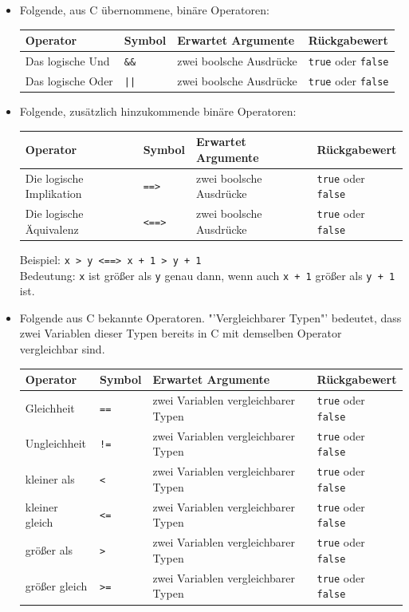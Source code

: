 \documentclass[a4paper]{scrreprt}
\begin{document}
\begin{itemize}
\item Folgende, aus C übernommene, binäre Operatoren:
\begin{table}[H]
\begin{tabular}{|p{3cm}|p{}|p{}|p{3cm}|}
	Operator & Symbol & Erwartet Argumente & Rückgabewert \\
	\hline
	Das logische Und & \verb!&&! & zwei boolsche Ausdrücke & \texttt{true} oder \texttt{false} \\
	Das logische Oder & \verb!||! & zwei boolsche Ausdrücke & \texttt{true} oder \texttt{false}	
	\end{tabular}
\end{table}	

\item Folgende, zusätzlich hinzukommende binäre Operatoren:
\begin{table}[H]
\begin{tabular}{|p{4cm}|p{}|p{}|p{3cm}|}
	Operator & Symbol & Erwartet Argumente & Rückgabewert \\
	\hline
	Die logische Implikation & \verb!==>! & zwei boolsche Ausdrücke & \texttt{true} oder \texttt{false} \\
	Die logische Äquivalenz & \verb!<==>! & zwei boolsche Ausdrücke & \texttt{true} oder \texttt{false}	
\end{tabular}
\end{table}	

Beispiel: \verb!x > y <==> x + 1 > y + 1! \\
Bedeutung: \verb!x! ist größer als \verb!y! genau dann, wenn auch \verb!x + 1! größer als \verb!y + 1! ist.

\item Folgende aus C bekannte Operatoren. "'Vergleichbarer Typen"' bedeutet, dass zwei Variablen dieser Typen bereits in C mit demselben Operator vergleichbar sind. 
\begin{table}[H]
\begin{tabular}{|p{}|p{}|p{6cm}|p{3cm}|}
	Operator & Symbol & Erwartet Argumente & Rückgabewert \\
	\hline
	Gleichheit & \verb!==! & zwei Variablen vergleichbarer Typen & \texttt{true} oder \texttt{false} \\
	Ungleichheit & \verb|!=| & zwei Variablen vergleichbarer Typen & \texttt{true} oder \texttt{false} \\
	kleiner als & \texttt{<} & zwei Variablen vergleichbarer Typen & \texttt{true} oder \texttt{false} \\
	kleiner gleich & \texttt{<=} & zwei Variablen vergleichbarer Typen & \texttt{true} oder \texttt{false} \\
	größer als & \texttt{>} & zwei Variablen vergleichbarer Typen & \texttt{true} oder \texttt{false} \\
	größer gleich & \texttt{>=} & zwei Variablen vergleichbarer Typen & \texttt{true} oder \texttt{false} \\
\end{tabular}
\end{table}	
 	

\end{itemize}
\end{document}
